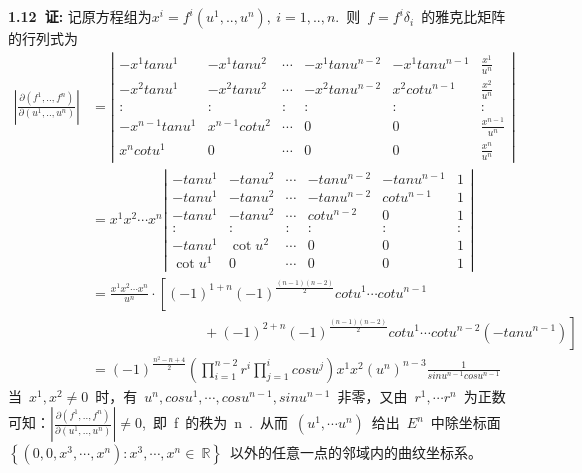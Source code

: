 \noindent
\\
\\
{\textbf{1.12\ 证:}} 记原方程组为$x^i=f^i(u^1,..,u^n),\ i=1,..,n.$\ 则\ $f=f^i\delta_i$\ 的雅克比矩阵的行列式为
\begin{align*}
     \left| \frac{\partial(f^1,..,f^n)}{\partial(u^1,..,u^n)} \right|
      &=\left|
          \begin{array}{ccccccc}
          -x^1tanu^1      &-x^1tanu^2      &\cdots   &-x^1tanu^{n-2}  &-x^1tanu^{n-1} &\frac{x^1}{u^n}
          \\
          -x^2tanu^1      &-x^2tanu^2      &\cdots   &-x^2tanu^{n-2}  &x^2cotu^{n-1}  &\frac{x^2}{u^n}
          \\
          \colon          &\colon      	   &\colon   &\colon          &\colon         &\colon
          \\
          -x^{n-1}tanu^1  &x^{n-1}cotu^2   &\cdots   &  0             &0              &\frac{x^{n-1}}{u^n}
          \\
          x^{n}cotu^1     &0               &\cdots   &  0             &0              &\frac{x^{n}}{u^n}
          \end{array}
     \right|
     \\
     &=x^1x^2\cdots x^n
       \left|
        \begin{array}{cccccccc}
        -tanu^1 &-tanu^2 &\cdots &-tanu^{n-2} &-tanu^{n-1} &1
        \\
        -tanu^1 &-tanu^2 &\cdots &-tanu^{n-2} &cotu^{n-1}  &1
        \\
        -tanu^1 &-tanu^2 &\cdots &cotu^{n-2}  &0           &1
        \\
        \colon  &\colon  &\colon &\colon      &\colon      &\colon
        \\
        -tanu^1 &\cot u^2&\cdots &0           &0           &1
        \\
        \cot u^1&0       &\cdots &0           &0           &1
        \end{array}
       \right|
    \\
    &=\frac{x^1 x^2 \cdots x^n}{u^n} \cdot \left[ (-1)^{1+n}  (-1)^{\frac{(n-1)(n-2)}2{}} cotu^1 \cdots cotu^{n-1}\right.
    \\&\left.\qquad\qquad\qquad\qquad+(-1)^{2+n} (-1)^{\frac{(n-1)(n-2)}{2}} cotu^1 \cdots cotu^{n-2}(-tanu^{n-1})\right]
    \\
    &=(-1)^{\frac{n^2-n+4}{2}} \left(\prod_{i=1}^{n-2} r^i \prod_{j=1}^{i}cosu^j\right) x^1x^2(u^n)^{n-3}\frac{1}{sinu^{n-1}cosu^{n-1}}
\end{align*}
当\ $x^1,x^2\neq 0$\ 时，有\ $u^n,cosu^1,\cdots,cosu^{n-1},sinu^{n-1}$\ 非零，又由\ $r^1,\cdots r^n$\ 为正数可知：$\left| \frac{\partial(f^1,..,f^n)}{\partial(u^1,..,u^n)} \right|\neq 0$,\ 即\ f\ 的秩为\ n\ .\ 从而\ $(u^1,\cdots u^n)$\ 给出\ $E^n$\ 中除坐标面\ $\left\lbrace  (0,0,x^3,\cdots,x^n):x^3,\cdots,x^n\in\ \mathbb{R} \right\rbrace $\ 以外的任意一点的邻域内的曲纹坐标系。



